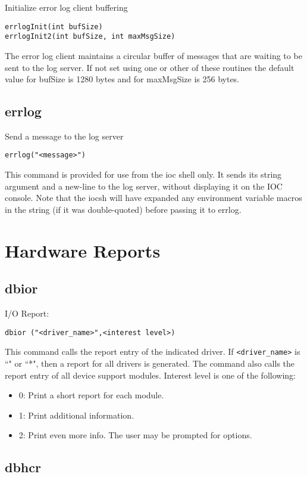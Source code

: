 Initialize error log client buffering

\begin{verbatim}errlogInit(int bufSize)
errlogInit2(int bufSize, int maxMsgSize)
\end{verbatim}The error log client maintains a circular buffer of messages that are waiting to be sent to the log server.  If not set using 
one or other of these routines the default value for bufSize is 1280 bytes and for maxMsgSize is 256 bytes.

\subsection{errlog}

Send a message to the log server

\begin{verbatim}errlog("<message>")
\end{verbatim}This command is provided for use from the ioc shell only.  It sends its string argument and a new-line to the log server, 
without displaying it on the IOC console. Note that the iocsh will have expanded any environment variable macros in the 
string (if it was double-quoted) before passing it to errlog.

\section{Hardware Reports}

\subsection{dbior}

I/O Report:

\begin{verbatim}dbior ("<driver_name>",<interest level>)
\end{verbatim}This command calls the report entry of the indicated driver. If \verb|<driver_name>| is ``" or ``*", then a report for all drivers 
is generated. The command also calls the report entry of all device support modules. Interest level is one of the following:

\begin{itemize}\item 0: Print a short report for each module.

\item 1:  Print additional information.

\item 2:  Print even more info. The user may be prompted for options.

\end{itemize}\subsection{dbhcr}

